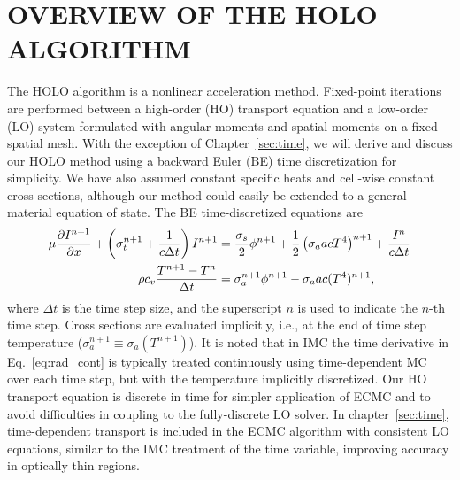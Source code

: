 
\chapter{\uppercase {Overview of the HOLO Algorithm}}
\label{chp:holo}

The HOLO algorithm is a nonlinear acceleration method.  Fixed-point iterations are performed between a
high-order (HO) transport equation and a low-order (LO) system formulated with angular moments
and spatial moments on a fixed spatial mesh. 
With the exception of Chapter~\ref{sec:time}, we will derive and discuss our HOLO
method using a backward Euler (BE) time discretization for simplicity.  We have also assumed constant specific heats
and cell-wise constant cross sections, although our method could easily be extended
to a general material equation of state. The BE time-discretized
equations are
\begin{align}
    \mu \frac{\partial I^{n+1}}{\partial x} + \left(\sigma_t^{n+1} + \frac{1}{c \Delta t }\right) I^{n+1}
&= \frac{\sigma_s}{2} \phi^{n+1} +\frac{1}{2} \left(\sigma_a a c T^4 \right)^{n+1} + \frac{I^n}{c \Delta t} \label{eq:trans_td} \\
\rho c_v \frac{T^{n+1} - T^n}{\Delta t} &= \sigma_a^{n+1} \phi^{n+1}
- \sigma_a a c (T^4)^{n+1} \label{eq:mat_td},
\end{align}
where $\Delta t$ is the time step size, and the superscript $n$ is used to indicate
the $n$-th time step. Cross sections are evaluated implicitly, i.e., at the end of time step
temperature ($\sigma_a^{n+1}\equiv\sigma_a(T^{n+1})$). It is noted that in IMC the time derivative in
Eq.~\eqref{eq:rad_cont} is typically treated continuously using time-dependent MC over each
time step, but with the temperature implicitly discretized.  Our HO transport equation is
discrete in time for simpler application of ECMC and to avoid difficulties in coupling to the
fully-discrete LO solver.  In chapter~\ref{sec:time}, time-dependent transport is
included in the ECMC algorithm with consistent LO equations, similar to the IMC
treatment of the time variable, improving accuracy in optically thin
regions.

